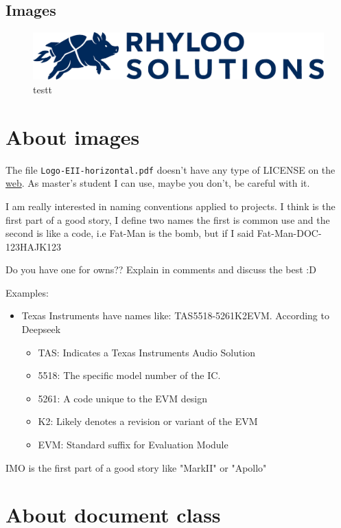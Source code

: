 \documentclass{reporti}
\begin{document}
\subsection{Images}
\label{sec:orgabbc4ba}
\begin{figure}[htbp]
\centering
\includegraphics[width=.9\linewidth]{./figures/logo/rhyloo_solutions_horizontal.pdf}
\caption{\label{fig:org35eccb4}testt}
\end{figure}

\section{About images}
\label{sec:orgb7763a0}
The file \texttt{Logo-EII-horizontal.pdf} doesn't have any type of LICENSE on the \href{https://www.uma.es/escuela-de-ingenierias-industriales/info/108566/logo-simbolo-de-la-eii/}{web}. As master's student I can use, maybe you don't, be careful with it.

I am really interested in naming conventions applied to projects. I think is the first part of a good story, I define two names the first is common use and the second is like a code, i.e Fat-Man is the bomb, but if I said Fat-Man-DOC-123HAJK123

Do you have one for owns?? Explain in comments and discuss the best :D

Examples:
\begin{itemize}
\item Texas Instruments have names like: TAS5518-5261K2EVM. According to Deepseek
\begin{itemize}
\item TAS: Indicates a Texas Instruments Audio Solution
\item 5518: The specific model number of the IC.
\item 5261: A code unique to the EVM design
\item K2: Likely denotes a revision or variant of the EVM
\item EVM: Standard suffix for Evaluation Module
\end{itemize}
\end{itemize}

IMO is the first part of a good story like "MarkII" or "Apollo"


\section{About document class}
\label{sec:orgc23859a}
\end{document}

